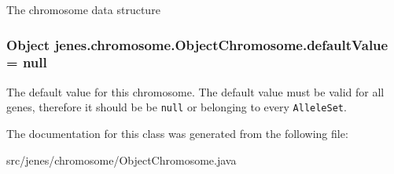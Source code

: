 The chromosome data structure \hypertarget{classjenes_1_1chromosome_1_1_object_chromosome_f5e2ac0b5272d948ec566f824baa3411}{
\subsubsection[defaultValue]{\setlength{\rightskip}{0pt plus 5cm}Object {\bf jenes.chromosome.ObjectChromosome.defaultValue} = null}}
\label{classjenes_1_1chromosome_1_1_object_chromosome_f5e2ac0b5272d948ec566f824baa3411}


The default value for this chromosome. The default value must be valid for all genes, therefore it should be be {\tt null} or belonging to every {\tt AlleleSet}. 

The documentation for this class was generated from the following file:\begin{CompactItemize}
\item 
src/jenes/chromosome/ObjectChromosome.java\end{CompactItemize}
